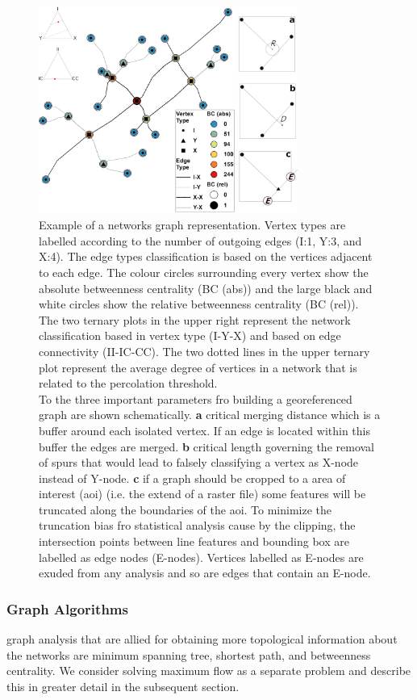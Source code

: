 \documentclass[a4paper,fleqn]{cas-sc}
\begin{document}
\begin{figure}[h]
\centering
	\includegraphics[width=8.5cm]{fig07.jpg}
	\caption{Example of a networks graph representation. Vertex types are labelled according to the number of outgoing edges (I:1, Y:3, and X:4). The edge types classification is based on the vertices adjacent to each edge. The colour circles surrounding every vertex show the absolute betweenness centrality (BC (abs)) and the large black and white circles show the relative betweenness centrality (BC (rel)). The two ternary plots in the upper right represent the network classification based in vertex type (I-Y-X) and based on edge connectivity (II-IC-CC). The two dotted lines in the upper ternary plot represent the average degree of vertices in a network that is related to the percolation threshold.\\
	To the three important parameters fro building a georeferenced graph are shown schematically. \textbf{a} critical merging distance which is a buffer around each isolated vertex. If an edge is located within this buffer the edges are merged. \textbf{b} critical length governing the removal of spurs that would lead to falsely classifying a vertex as X-node instead of Y-node. \textbf{c} if a graph should be cropped to a area of interest (aoi) (i.e. the extend of a raster file) some features will be truncated along the boundaries of the aoi. To minimize the truncation bias fro statistical analysis cause by the clipping, the intersection points between line features and bounding box are labelled as edge nodes (E-nodes). Vertices labelled as E-nodes are exuded from any analysis and so are edges that contain an E-node.}
\label{fig07}
\end{figure}

\subsubsection{Graph Algorithms}
graph analysis that are allied for obtaining more topological information about the networks are minimum spanning tree, shortest path, and betweenness centrality. We consider solving maximum flow as a separate problem and describe this in greater detail in the subsequent section.
\end{document}
